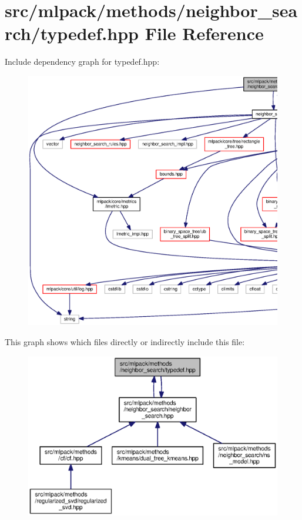 \section{src/mlpack/methods/neighbor\+\_\+search/typedef.hpp File Reference}
\label{methods_2neighbor__search_2typedef_8hpp}
Include dependency graph for typedef.\+hpp\+:
\nopagebreak
\begin{figure}[H]
\begin{center}
\leavevmode
\includegraphics[width=350pt]{methods_2neighbor__search_2typedef_8hpp__incl}
\end{center}
\end{figure}
This graph shows which files directly or indirectly include this file\+:
\nopagebreak
\begin{figure}[H]
\begin{center}
\leavevmode
\includegraphics[width=350pt]{methods_2neighbor__search_2typedef_8hpp__dep__incl}
\end{center}
\end{figure}
